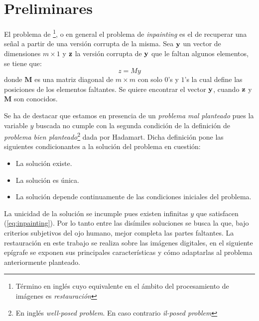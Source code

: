 \chapter{Preliminares}\label{chapter:background}

\begin{definition}\label{def:inpainting}
	El problema de \II\footnote{T\'ermino en ingl\'es cuyo equivalente en el \'ambito del procesamiento de im\'agenes es \textit{restauraci\'on}}, o en general el problema de \textit{inpainting} es el de recuperar una señal a partir de una versi\'on corrupta de la misma. Sea $\mathbf{y}$ un vector de dimensiones $m \times 1$ y $\mathbf{z}$ la versi\'on corrupta de $\mathbf{y}$ que le faltan algunos elementos, se tiene que:
	\begin{equation}
		z = My
		\label{eq:inpainting}
	\end{equation}
	donde $\mathbf{M}$ es una matriz diagonal de $m \times m$ con solo $0$'s y $1$'s la cual define las posiciones de los elementos faltantes. Se quiere encontrar el vector $\mathbf{y}$, cuando $\mathbf{z}$ y  $\mathbf{M}$ son conocidos. 
\end{definition}

Se ha de destacar que estamos en presencia de un \textit{problema mal planteado} pues la variable $y$ buscada no cumple con la segunda condición de la definición de \textit{problema bien planteado}\footnote{En ingl\'es \textit{well-posed problem}. En caso contrario \textit{il-posed problem}} \cite{enwiki:wpp} dada por Hadamart. Dicha definición pone las siguientes condicionantes a la soluci\'on  del problema en cuestión:
\begin{itemize}
	\item La soluci\'on existe.
	\item La soluci\'on es \'unica.
	\item La soluci\'on depende continuamente de las condiciones iniciales del problema.
\end{itemize}
La unicidad de la soluci\'on se incumple pues existen infinitas $y$ que satisfacen (\ref{eq:inpainting}). Por lo tanto entre las dis\'imiles soluciones se busca la que, bajo criterios subjetivos del ojo humano, mejor completa las partes faltantes. La restauraci\'on en este trabajo se realiza sobre las im\'agenes digitales, en el siguiente ep\'igrafe se exponen sus principales características y c\'omo adaptarlas al problema anteriormente planteado. 

